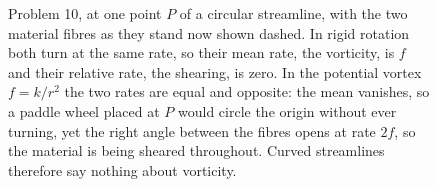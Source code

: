 \begin{figure}[htbp]
\caption{Problem 10, at one point $P$ of a circular streamline, with the
two material fibres as they stand now shown dashed. In rigid rotation both
turn at the same rate, so their mean rate, the vorticity, is $f$ and their
relative rate, the shearing, is zero. In the potential vortex $f=k/r^{2}$
the two rates are equal and opposite: the mean vanishes, so a paddle wheel
placed at $P$ would circle the origin without ever turning, yet the right
angle between the fibres opens at rate $2f$, so the material is being
sheared throughout. Curved streamlines therefore say nothing about
vorticity.}
\label{fig:vortex}
\end{figure}
